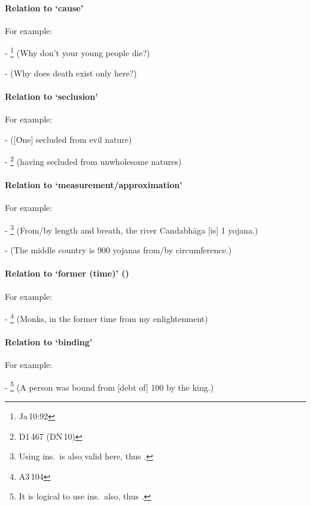\paragraph*{Relation to `cause'} For example:\par
- \footnote{Ja\,10:92} (Why don't your young people die?)\par
-  (Why does death exist only here?)\par

\paragraph*{Relation to `seclusion'} For example:\par
-  ([One] secluded from evil nature)\par
- \footnote{D1\,467 (DN\,10)} (having secluded from unwholesome natures)\par

\paragraph*{Relation to `measurement/approximation'} For example:\par
- \footnote{Using ins.\ is also valid here, thus .} (From/by length and breath, the river Candabh\=aga [is] 1 yojana.)\par
-  (The middle country is 900 yojanas from/by circumference.)\par

\paragraph*{Relation to `former (time)' ()} For example:\par
- \footnote{A3\,104} (Monks, in the former time from my enlightenment)\par

\paragraph*{Relation to `binding'} For example:\par
- \footnote{It is logical to use ins.\ also, thus .} (A person was bound from [debt of] 100 by the king.)\par

